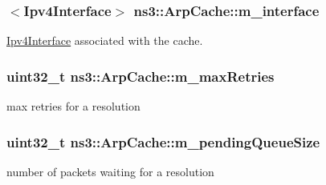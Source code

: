 \subsubsection[{\texorpdfstring{m\+\_\+interface}{m_interface}}]{$<${\bf Ipv4\+Interface}$>$ ns3\+::\+Arp\+Cache\+::m\+\_\+interface\hspace{0.3cm}{\ttfamily [private]}}\hypertarget{classns3_1_1ArpCache_a51ac32b4e89fdfb85f0a30a5104f5857}{}\label{classns3_1_1ArpCache_a51ac32b4e89fdfb85f0a30a5104f5857}


\hyperlink{classns3_1_1Ipv4Interface}{Ipv4\+Interface} associated with the cache. 

\subsubsection[{\texorpdfstring{m\+\_\+max\+Retries}{m_maxRetries}}]{\setlength{\rightskip}{0pt plus 5cm}uint32\+\_\+t ns3\+::\+Arp\+Cache\+::m\+\_\+max\+Retries\hspace{0.3cm}{\ttfamily [private]}}\hypertarget{classns3_1_1ArpCache_a24f0460babb1745ff532b16710846ab9}{}\label{classns3_1_1ArpCache_a24f0460babb1745ff532b16710846ab9}


max retries for a resolution 

\subsubsection[{\texorpdfstring{m\+\_\+pending\+Queue\+Size}{m_pendingQueueSize}}]{\setlength{\rightskip}{0pt plus 5cm}uint32\+\_\+t ns3\+::\+Arp\+Cache\+::m\+\_\+pending\+Queue\+Size\hspace{0.3cm}{\ttfamily [private]}}\hypertarget{classns3_1_1ArpCache_a70391342295055352cc9cfcf34d3cc52}{}\label{classns3_1_1ArpCache_a70391342295055352cc9cfcf34d3cc52}


number of packets waiting for a resolution 


